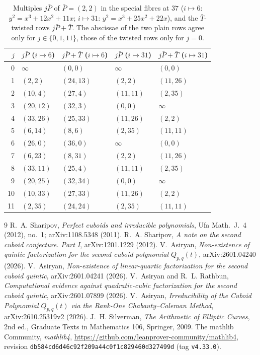 \documentclass[10pt]{article}
\theoremstyle{definition}
\theoremstyle{remark}
\begin{document}
\begin{table}[ht]
\centering\small
\caption{Multiples $j\bar P$ of $\bar P=(2,2)$ in the special fibres at $37$
($i\mapsto6$: $y^2=x^3+12x^2+11x$; $i\mapsto31$: $y^2=x^3+25x^2+22x$), and the
$\bar T$-twisted rows $j\bar P+\bar T$.  The abscissae of the two plain rows
agree only for $j\in\{0,1,11\}$, those of the twisted rows only for $j=0$.}\label{tab:rows}
\begin{tabular}{@{}rllll@{}}
\toprule
$j$ & $j\bar P$ ($i\mapsto6$) & $j\bar P+\bar T$ ($i\mapsto6$) & $j\bar P$ ($i\mapsto31$) & $j\bar P+\bar T$ ($i\mapsto31$)\\
\midrule
0 & $\infty$ & $(0,0)$ & $\infty$ & $(0,0)$\\
1 & $(2,2)$ & $(24,13)$ & $(2,2)$ & $(11,26)$\\
2 & $(10,4)$ & $(27,4)$ & $(11,11)$ & $(2,35)$\\
3 & $(20,12)$ & $(32,3)$ & $(0,0)$ & $\infty$\\
4 & $(33,26)$ & $(25,33)$ & $(11,26)$ & $(2,2)$\\
5 & $(6,14)$ & $(8,6)$ & $(2,35)$ & $(11,11)$\\
6 & $(26,0)$ & $(36,0)$ & $\infty$ & $(0,0)$\\
7 & $(6,23)$ & $(8,31)$ & $(2,2)$ & $(11,26)$\\
8 & $(33,11)$ & $(25,4)$ & $(11,11)$ & $(2,35)$\\
9 & $(20,25)$ & $(32,34)$ & $(0,0)$ & $\infty$\\
10 & $(10,33)$ & $(27,33)$ & $(11,26)$ & $(2,2)$\\
11 & $(2,35)$ & $(24,24)$ & $(2,35)$ & $(11,11)$\\
\bottomrule
\end{tabular}
\end{table}

\FloatBarrier
\begin{thebibliography}{9}
 R.~A. Sharipov, \emph{Perfect cuboids and irreducible polynomials}, Ufa Math.\ J.\ 4 (2012), no.~1; arXiv:1108.5348 (2011).
 R.~A. Sharipov, \emph{A note on the second cuboid conjecture. Part I}, arXiv:1201.1229 (2012).
 V.~Asiryan, \emph{Non-existence of quintic factorization for the second cuboid polynomial $Q_{p,q}(t)$}, arXiv:2601.04240 (2026).
 V.~Asiryan, \emph{Non-existence of linear-quartic factorization for the second cuboid quintic}, arXiv:2601.04241 (2026).
 V.~Asiryan and R.~L. Rathbun, \emph{Computational evidence against quadratic-cubic factorization for the second cuboid quintic}, arXiv:2601.07899 (2026).
 V.~Asiryan, \emph{Irreducibility of the Cuboid Polynomial $Q_{p,q}(t)$ via the Rank-One Chabauty--Coleman Method}, \href{https://arxiv.org/abs/2610.25319v2}{arXiv:2610.25319v2} (2026).
 J.~H. Silverman, \emph{The Arithmetic of Elliptic Curves}, 2nd ed., Graduate Texts in Mathematics 106, Springer, 2009.
 The mathlib Community, \emph{mathlib4}, \url{https://github.com/leanprover-community/mathlib4}, revision \texttt{db584cd6d46c92f209a44c0f1c829460d327499d} (tag \texttt{v4.33.0}).
\end{thebibliography}
\end{document}
